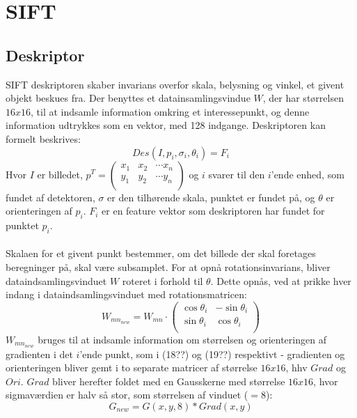 \section{SIFT}

\subsection{Deskriptor}
SIFT deskriptoren skaber invarians overfor skala, belysning og vinkel, et givent objekt beskues fra. Der benyttes et datainsamlingsvindue $W$, der har størrelsen $16x16$, til at indsamle information omkring et interessepunkt, og denne information udtrykkes som en vektor, med 128 indgange. Deskriptoren kan formelt beskrives:
\begin{equation}
Des(I, p_i,\sigma_i,\theta_i) = F_i
\end{equation}
Hvor $I$ er billedet, 
$p^T = \begin{pmatrix}
	x_1 & x_2 & \cdots x_n \\
	y_1 & y_2 & \cdots y_n \\
\end{pmatrix}$ og $i$ svarer til den $i$'ende enhed, som fundet af detektoren, $\sigma$ er den tilhørende skala, punktet er fundet på, og $\theta$ er orienteringen af $p_i$. $F_i$ er en feature vektor som deskriptoren har fundet for punktet $p_i$.
\\
\\
Skalaen for et givent punkt bestemmer, om det billede der skal foretages beregninger på, skal være subsamplet. For at opnå rotationsinvarians, bliver dataindsamlingsvinduet $W$ roteret i forhold til $\theta$. Dette opnås, ved at prikke hver indang i dataindsamlingsvinduet med rotationsmatricen:
\begin{equation}
W_{{mn}_{new}} = W_{mn} \cdot
\begin{pmatrix}
  \cos \theta_i & -\sin \theta_i \\
  \sin \theta_i & \cos \theta_i  \\
\end{pmatrix}
\label{rotaionmatrix}
\end{equation}
$W_{{mn}_{new}}$ bruges til at indsamle information om størrelsen og orienteringen af gradienten i det $i$'ende punkt, som i (18??) og (19??) respektivt - gradienten og orienteringen bliver gemt i to separate matricer af størrelse $16x16$, hhv $Grad$ og $Ori$. $Grad$ bliver herefter foldet med en Gausskerne med størrelse $16x16$, hvor sigmaværdien er halv så stor, som størrelsen af vinduet ($=8$):
\begin{equation}
G_{new} = G(x,y,8) * Grad(x,y)
\end{equation}
